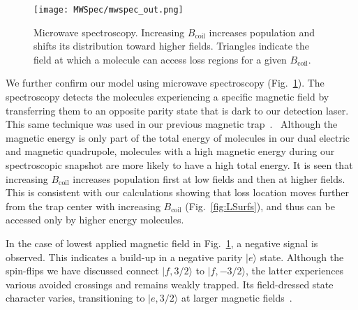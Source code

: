 \documentclass[%
 reprint,
 amsmath,amssymb,
 aps,
prl,
]{revtex4-1}
\newcommand{\bcl}{{$B_\text{coil}$}}
\newcommand{\cmnt}[1]{\ignorespaces}
\begin{document}
\begin{figure}[tb]
\texttt{[image: MWSpec/mwspec\_out.png]}%
\caption{
Microwave spectroscopy. Increasing \bcl{} increases population and shifts its distribution toward higher fields. Triangles indicate the field at which a molecule can access loss regions for a given \bcl.
\label{fig:spec}}
\end{figure}

We further confirm our model using microwave spectroscopy (Fig.~\ref{fig:spec}). The spectroscopy detects the molecules experiencing a specific magnetic field by transferring them to an opposite parity state that is dark to our detection laser. This same technique was used in our previous magnetic trap~\cite{Stuhl2012evap}.\cmnt{, with the notable difference that here we turn off the electric trapping field just before the spectroscopy, which happens before any significant molecular motion. \cmnt{but with a microwave probe directly exciting free space modes of our vacuum chamber\cmnt{instead of a bias tee}.}}  ~Although the magnetic energy is only part of the total energy of molecules in our dual electric and magnetic quadrupole, molecules with a high magnetic energy during our spectroscopic snapshot are more likely to have a high total energy. It is seen that increasing \bcl{} increases population first at low fields and then at higher fields. This is consistent with our calculations showing that loss location moves further from the trap center with increasing \bcl{} (Fig.~\ref{fig:LSurfs}), and thus can be accessed only by higher energy molecules. %


In the case of lowest applied magnetic field in Fig.~\ref{fig:spec}, a negative signal is observed. This indicates a build-up in a negative parity $|e\rangle$ state. Although the spin-flips we have discussed connect $|f,3/2\rangle$ to $|f,-3/2\rangle$, the latter experiences various avoided crossings and remains weakly trapped.  Its field-dressed state character varies, transitioning to $|e,3/2\rangle$ at larger magnetic fields~\cite{Stuhl2012uwave}. %
\end{document}
